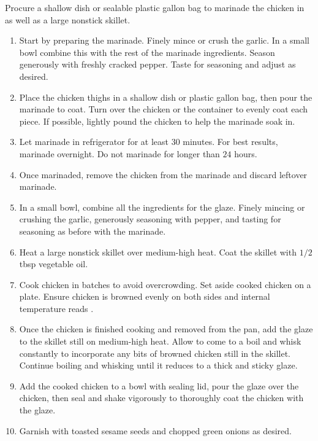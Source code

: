 \instructions
Procure a shallow dish or sealable plastic gallon bag to marinade the chicken in as well as a large nonstick skillet.
\begin{enumerate}
    \item Start by preparing the marinade. Finely mince or crush the garlic. In a small bowl combine this with the rest of the marinade ingredients. Season generously with freshly cracked pepper. Taste for seasoning and adjust as desired.
    \item Place the chicken thighs in a shallow dish or plastic gallon bag, then pour the marinade to coat. Turn over the chicken or the container to evenly coat each piece. If possible, lightly pound the chicken to help the marinade soak in.
    \item Let marinade in refrigerator for at least $30$ minutes. For best results, marinade overnight. Do not marinade for longer than $24$ hours.
    \item Once marinaded, remove the chicken from the marinade and discard leftover marinade.
    \item In a small bowl, combine all the ingredients for the glaze. Finely mincing or crushing the garlic, generously seasoning with pepper, and tasting for seasoning as before with the marinade.
    \item Heat a large nonstick skillet over medium-high heat. Coat the skillet with $1/2$ tbsp vegetable oil.
    \item Cook chicken in batches to avoid overcrowding. Set aside cooked chicken on a plate. Ensure chicken is browned evenly on both sides and internal temperature reads .
    \item Once the chicken is finished cooking and removed from the pan, add the glaze to the skillet still on medium-high heat. Allow to come to a boil and whisk constantly to incorporate any bits of browned chicken still in the skillet. Continue boiling and whisking until it reduces to a thick and sticky glaze.
    \item Add the cooked chicken to a bowl with sealing lid, pour the glaze over the chicken, then seal and shake vigorously to thoroughly coat the chicken with the glaze.
    \item Garnish with toasted sesame seeds and chopped green onions as desired.
\end{enumerate}
\newpage
